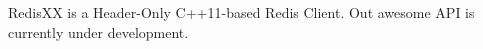 Redis\-X\-X is a Header-\/\-Only C++11-\/based Redis Client. Out awesome A\-P\-I is currently under development. 
